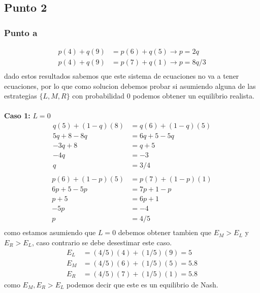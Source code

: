 \documentclass[11pt]{article}
\begin{document}
\subsection{Punto 2}
\subsubsection{Punto a}
\begin{flushleft}
    \begin{align*}
        p(4)+q(9)&=p(6)+q(5)\to p=2q\\
        p(4)+q(9)&=p(7)+q(1) \to p=8q/3\\
    \end{align*}
    dado estos resultados sabemos que este sistema de ecuaciones no va a tener ecuaciones,
    por lo que como solucion debemos probar si asumiendo alguna de las estrategias $\{L,M,R\}$
    con probabilidad 0 podemos obtener un equilibrio realista.\\~\\
    
    \textbf{Caso 1: }$L=0$\\

    \begin{align*}
        q(5)+(1-q)(8)&=q(6)+(1-q)(5)\\
        5q+8-8q&=6q+5-5q\\
        -3q+8&=q+5\\
        -4q&=-3\\
        q&=3/4\\
    \end{align*}
    \begin{align*}
        p(6)+(1-p)(5)&=p(7)+(1-p)(1)\\
        6p+5-5p&=7p+1-p\\
        p+5&=6p+1\\
        -5p&=-4\\
        p&=4/5\\
    \end{align*}
    como estamos asumiendo que $L=0$ debemos obtener tambien que $E_M>E_L$ y $E_R>E_L$, caso contrario se debe desestimar este caso.\\
    \begin{align*}
        E_L&=(4/5)(4)+(1/5)(9)=5\\
        E_M&=(4/5)(6)+(1/5)(5)=5.8\\
        E_R&=(4/5)(7)+(1/5)(1)=5.8
    \end{align*}
    como $E_M,E_R>E_L$ podemos decir que este es un equilibrio de Nash.\\~\\
\end{flushleft}
\end{document}
